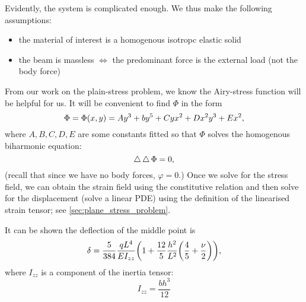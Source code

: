 \documentclass[reqno, a4paper]{article}
\begin{document}
Evidently, the system is complicated enough. We thus make the following assumptions:

\begin{itemize}
	\item the material of interest is a homogenous isotropc elastic solid
	\item the beam is massless $\Leftrightarrow$ the predominant force is the external load (not the body force)
\end{itemize}

From our work on the plain-stress problem, we know the Airy-stress function will be helpful for us. It will be convenient to find $\Phi$ in the form
\[
	\Phi = \Phi\qty(x,y) = A y^{3} + b y^5 + C yx^{2}+ D x^{2}y^{3}+Ex^{2},
\]
where $A,B,C,D,E$ are some constants fitted so that $\Phi$ solves the homogenous biharmonic equation: 
\[
	\operatorname{\bigtriangleup} \operatorname{\bigtriangleup} \Phi = 0,
\]
(recall that since we have no body forces, $\varphi = 0.$) Once we solve for the stress field, we can obtain the strain field using the constitutive relation and then solve for the displacement (solve a linear PDE) using the definition of the linearised strain tensor; see \ref{sec:plane_stress_problem}.

It can be shown the deflection of the middle point is 
\[
	\delta = \frac{5}{384}\frac{qL^4}{EI_{zz}}\qty(1+\frac{12}{5}\frac{h^{2}}{L^{2}}\qty(\frac{4}{5}+\frac{\nu}{2})),
\]
where $I_{zz}$ is a component of the inertia tensor:
\[
	I_{zz} = \frac{bh^{3}}{12}
\]
\end{document}
